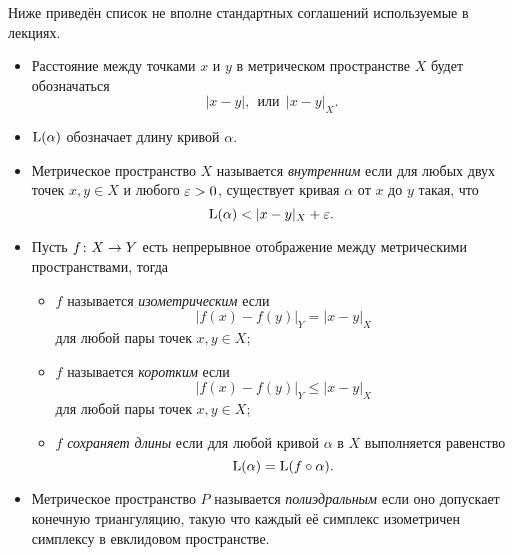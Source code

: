 Ниже приведён список не вполне стандартных соглашений используемые в лекциях.
\begin{itemize}
\item Расстояние между точками $x$ и $y$ в метрическом пространстве $X$
будет обозначаться 
$$|x-y|,
\ \ 
\text{или}\ \  |x-y|_X.$$ 

\item $\operatorname{\rm L}(\alpha)$ обозначает длину кривой $\alpha$.

\item Метрическое пространство $X$ называется \emph{внутренним}
если для любых двух точек $x,y\in X$ и любого $\varepsilon>0$, 
существует кривая $\alpha$ от $x$ до $y$ такая, что
$$\length(\alpha)<|x-y|_X+\eps.$$
\item \label{def:length-preserving}
Пусть $f\:X\z\to Y$ есть непрерывное отображение между метрическими пространствами, 
тогда
\begin{itemize}
\item $f$ называется \emph{изометрическим} если
$$|f(x)-f(y)|_Y=|x-y|_X$$
для любой пары точек $x,y\in X$;
\item $f$ называется \emph{коротким} если
$$|f(x)-f(y)|_Y\le|x-y|_X$$
для любой пары точек $x,y\in X$;
\item $f$ \emph{сохраняет длины} если для любой кривой $\alpha$ в $X$ выполняется равенство
$$\operatorname{\rm L}(\alpha)=\operatorname{\rm L}(f\circ\alpha).$$
\end{itemize}

\item Метрическое пространство $P$ называется \emph{полиэдральным}
если оно допускает конечную триангуляцию, 
такую что каждый её симплекс изометричен симплексу в евклидовом пространстве.
\end{itemize}



